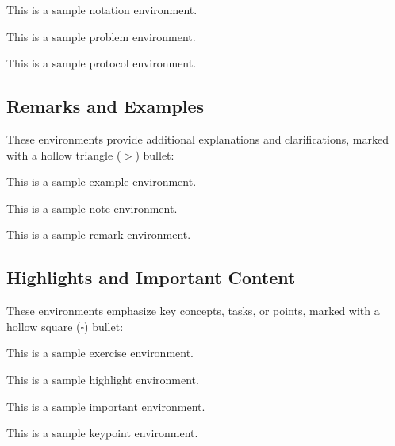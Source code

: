 \documentclass{amsart}
\begin{document}
\begin{notation}
	This is a sample notation environment.
\end{notation}

\begin{problem}
This is a sample problem environment.
\end{problem}

\begin{protocol}
	This is a sample protocol environment.
\end{protocol}

\subsection{Remarks and Examples}

These environments provide additional explanations and clarifications, marked with a hollow triangle ($\vartriangleright$) bullet:

\begin{example}
	This is a sample example environment.
\end{example}

\begin{note}
	This is a sample note environment.
\end{note}

\begin{remark}
	This is a sample remark environment.
\end{remark}

\subsection{Highlights and Important Content}

These environments emphasize key concepts, tasks, or points, marked with a hollow square ($\square$) bullet:

\begin{exercise}
	This is a sample exercise environment.
\end{exercise}

\begin{highlight}
	This is a sample highlight environment.
\end{highlight}

\begin{important}
	This is a sample important environment.
\end{important}

\begin{keypoint}
	This is a sample keypoint environment.
\end{keypoint}
\end{document}
